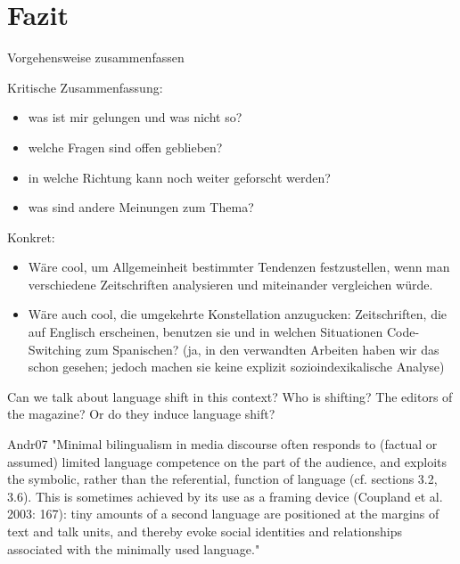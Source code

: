 \section{Fazit}

\begin{comment}
    * Einleitung und Fazit müssen zusammenpassen.
    * sind die Erkenntnisse im Fazit aus der Arbeit ableitbar?
    * Vorgehensweise zusammenfassen

\end{comment}

Vorgehensweise zusammenfassen

Kritische Zusammenfassung:
\begin{itemize}
    \item was ist mir gelungen und was nicht so?
    \item welche Fragen sind offen geblieben?
    \item in welche Richtung kann noch weiter geforscht werden?
    \item was sind andere Meinungen zum Thema?
\end{itemize}

Konkret:
\begin{itemize}
   \item Wäre cool, um Allgemeinheit bestimmter Tendenzen festzustellen, wenn man verschiedene Zeitschriften analysieren und miteinander vergleichen würde.
   \item Wäre auch cool, die umgekehrte Konstellation anzugucken: Zeitschriften, die auf Englisch erscheinen, benutzen sie und in welchen Situationen Code-Switching zum Spanischen? (ja, in den verwandten Arbeiten haben wir das schon gesehen; jedoch machen sie keine explizit sozioindexikalische Analyse)
\end{itemize}

Can we talk about language shift in this context?
Who is shifting? The editors of the magazine? Or do they induce language shift?


{Andr07}
"Minimal bilingualism
in media discourse often responds to (factual or assumed) limited language
competence on the part of the audience, and exploits the symbolic, rather
than the referential, function of language (cf. sections 3.2, 3.6). This is
sometimes achieved by its use as a framing device (Coupland et al. 2003:
167): tiny amounts of a second language are positioned at the margins of
text and talk units, and thereby evoke social identities and relationships
associated with the minimally used language."


